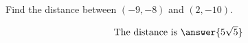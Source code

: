 \documentclass{ximera}
\author{Bart Snapp}
\begin{document}
\begin{exercise}
  Find the distance between $(-9,-8)$ and $(2,-10)$.
  \begin{prompt}
  \[
  \text{The distance is }\answer{5\sqrt{5}}
  \]
  \end{prompt}
\end{exercise}
\end{document}
